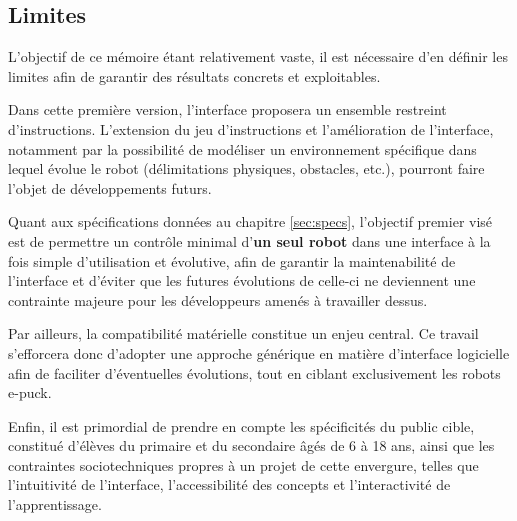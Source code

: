 \subsection{Limites} \label{sec:limites}

L’objectif de ce mémoire étant relativement vaste, il est nécessaire d’en définir les limites afin de garantir des résultats concrets et exploitables.  

Dans cette première version, l’interface proposera un ensemble restreint d’instructions.
L’extension du jeu d’instructions et l’amélioration de l’interface, notamment par la possibilité de modéliser un environnement spécifique dans lequel évolue le robot (délimitations physiques, obstacles, etc.), pourront faire l’objet de développements futurs.

Quant aux spécifications données au chapitre \ref{sec:specs}, l'objectif premier visé est de permettre un contrôle minimal d'\textbf{un seul robot} dans une interface à la fois simple d’utilisation et évolutive, afin de garantir la maintenabilité de l'interface et d’éviter que les futures évolutions de celle-ci ne deviennent une contrainte majeure pour les développeurs amenés à travailler dessus.

Par ailleurs, la compatibilité matérielle constitue un enjeu central.
Ce travail s’efforcera donc d’adopter une approche générique en matière d’interface logicielle afin de faciliter d’éventuelles évolutions, tout en ciblant exclusivement les robots e-puck.

Enfin, il est primordial de prendre en compte les spécificités du public cible, constitué d’élèves du primaire et du secondaire âgés de 6 à 18 ans, ainsi que les contraintes sociotechniques propres à un projet de cette envergure, telles que l’intuitivité de l’interface, l’accessibilité des concepts et l’interactivité de l’apprentissage.  

